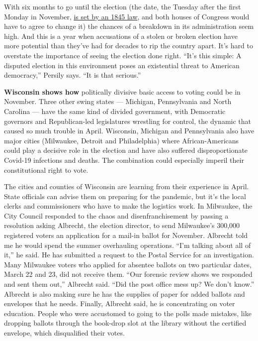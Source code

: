 With six months to go until the election (the date, the Tuesday after
the first Monday in November,
\href{https://www.loc.gov/law/help/statutes-at-large/28th-congress/session-2/c28s2ch1.pdf}{is
set by an 1845 law}, and both houses of Congress would have to agree to
change it) the chances of a breakdown in its administration seem high.
And this is a year when accusations of a stolen or broken election have
more potential than they've had for decades to rip the country apart.
It's hard to overstate the importance of seeing the election done right.
``It's this simple: A disputed election in this environment poses an
existential threat to American democracy,'' Persily says. ``It is that
serious.''

\textbf{Wisconsin shows how} politically divisive basic access to voting
could be in November. Three other swing states --- Michi­gan,
Pennsylvania and North Carolina --- have the same kind of divided
government, with Democratic governors and Republican-led legislatures
wrestling for control, the dynamic that caused so much trouble in April.
Wisconsin, Michigan and Pennsylvania also have major cities (Milwaukee,
Detroit and Philadelphia) where African-Americans could play a decisive
role in the election and have also suffered disproportionate Covid-19
infections and deaths. The combination could especially imperil their
constitutional right to vote.

The cities and counties of Wisconsin are learning from their experience
in April. State officials can advise them on preparing for the pandemic,
but it's the local clerks and commissioners who have to make the
logistics work. In Milwaukee, the City Council responded to the chaos
and disenfranchisement by passing a resolution asking Albrecht, the
election director, to send Milwaukee's 300,000 registered voters an
application for a mail-in ballot for November. Albrecht told me he would
spend the summer overhauling operations. ``I'm talking about all of
it,'' he said. He has submitted a request to the Postal Service for an
investigation. Many Milwaukee voters who applied for absentee ballots on
two particular dates, March 22 and 23, did not receive them. ``Our
forensic review shows we responded and sent them out,'' Albrecht said.
``Did the post office mess up? We don't know.'' Albrecht is also making
sure he has the supplies of paper for added ballots and envelopes that
he needs. Finally, Albrecht said, he is concentrating on voter
education. People who were accustomed to going to the polls made
mistakes, like dropping ballots through the book-drop slot at the
library without the certified envelope, which disqualified their votes.

